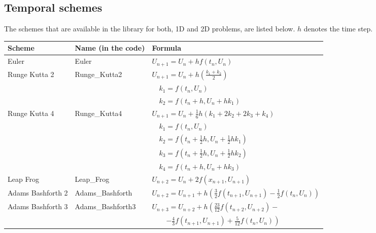 \newpage

\subsection{Temporal schemes}

The schemes that are available in the library for both, 1D and 2D problems, are listed below. $h$ denotes the time step.

\begin{table}[H]
	\begin{center}
		\begin{spacing}{1.5}
			\begin{tabular}{| l | l | l |}
				
				\hline
				
				\bf Scheme & \bf Name (in the code) & \bf Formula  \\ \hline \hline
				
				Euler & Euler & $  U_{n+1} = U_{n}+ h f(t_{n}, U_{n})$ \\ \hline
				
				Runge Kutta 2  &  Runge\_Kutta2   &  
				$ U_{n+1} = U_{n}+ h(\frac{k_{1}+k_{2}} {2} ) $ \\
				& & $\quad k_{1}= f(t_{n},U_{n}) $ \\
				& & $\quad k_{2}=f(t_{n}+h, U_{n}+hk_{1}) $ \\ \hline
				
				Runge Kutta 4 & Runge\_Kutta4 &  $ U_{n+1} = U_{n}+ \frac{1}{6}h (k_{1}+2k_{2}+2k_{3}+k_{4}) $ \\
				& & $\quad k_{1}= f(t_{n},U_{n}) $ \\
				& & $\quad k_{2}=f(t_{n}+\frac{1}{2}h, U_{n}+\frac{1}{2}hk_{1}) $ \\
				& & $\quad k_{3}=f(t_{n}+\frac{1}{2}h, U_{n}+\frac{1}{2}hk_{2}) $\\
				& & $\quad k_{4}= f(t_{n}+h,U_{n}+hk_{3}) $  \\ \hline
				
				Leap Frog & Leap\_Frog  & $ U_{n+2}=U_{n}+2f(x_{n+1},U_{n+1})$ \\ \hline
				
				Adams Bashforth 2 & Adams\_Bashforth  & $ U_{n+2}=U_{n+1}+ h \left( \frac{3}{2} f(t_{n+1},U_{n+1}) - \frac{1}{2} f(t_{n},U_{n}) \right) $  \\ \hline
				
				Adams Bashforth 3  & Adams\_Bashforth3  & $  U_{n+3} = U_{n+2}+ h \left( \frac{23}{12} f(t_{n+2},U_{n+2}) - \right.$ \\
				& & $\qquad\left.-\frac{4}{3} f(t_{n+1},U_{n+1}) + \frac{5}{12} f(t_{n},U_{n}) \right) $ \\ \hline
				

\end{tabular}
\end{spacing}
\end{center}
\end{table}
